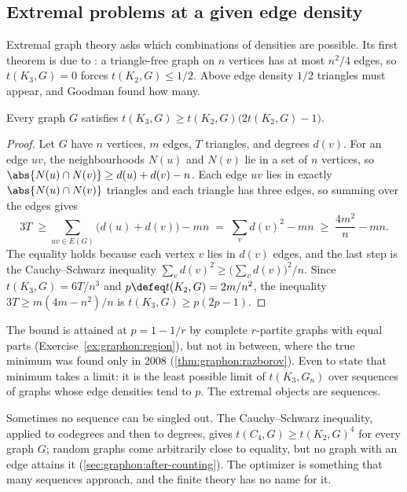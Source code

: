 \begin{refsection}
\subsection{Extremal problems at a given edge density}

Extremal graph theory asks which combinations of densities are possible. Its first theorem is due to \textcite{Mantel1907}: a triangle-free graph on $n$ vertices has at most $n^2/4$ edges, so $t(K_3,G)=0$ forces $t(K_2,G)\le1/2$. Above edge density $1/2$ triangles must appear, and Goodman found how many.

\begin{theorem}\label{thm:graphon:goodman-finite}
Every graph $G$ satisfies $t(K_3,G)\ge t(K_2,G)\bigl(2t(K_2,G)-1\bigr)$.
\end{theorem}

\begin{proof}
Let $G$ have $n$ vertices, $m$ edges, $T$ triangles, and degrees $d(v)$. For an edge $uv$, the neighbourhoods $N(u)$ and $N(v)$ lie in a set of $n$ vertices, so $\abs{N(u)\cap N(v)}\ge d(u)+d(v)-n$. Each edge $uv$ lies in exactly $\abs{N(u)\cap N(v)}$ triangles and each triangle has three edges, so summing over the edges gives
\[
  3T\;\ge\sum_{uv\in E(G)}\bigl(d(u)+d(v)\bigr)-mn\;=\;\sum_{v}d(v)^2-mn\;\ge\;\frac{4m^2}{n}-mn .
\]
The equality holds because each vertex $v$ lies in $d(v)$ edges, and the last step is the Cauchy--Schwarz inequality $\sum_v d(v)^2\ge\bigl(\sum_v d(v)\bigr)^2/n$. Since $t(K_3,G)=6T/n^3$ and $p\defeq t(K_2,G)=2m/n^2$, the inequality $3T\ge m(4m-n^2)/n$ is $t(K_3,G)\ge p(2p-1)$.
\end{proof}

The bound is attained at $p=1-1/r$ by complete $r$-partite graphs with equal parts (Exercise~\ref{ex:graphon:region}), but not in between, where the true minimum was found only in 2008 (\cref{thm:graphon:razborov}). Even to state that minimum takes a limit: it is the least possible limit of $t(K_3,G_n)$ over sequences of graphs whose edge densities tend to $p$. The extremal objects are sequences.

Sometimes no sequence can be singled out. The Cauchy--Schwarz inequality, applied to codegrees and then to degrees, gives $t(C_4,G)\ge t(K_2,G)^4$ for every graph $G$; random graphs come arbitrarily close to equality, but no graph with an edge attains it (\cref{sec:graphon:after-counting}). The optimizer is something that many sequences approach, and the finite theory has no name for it.


\end{refsection}
